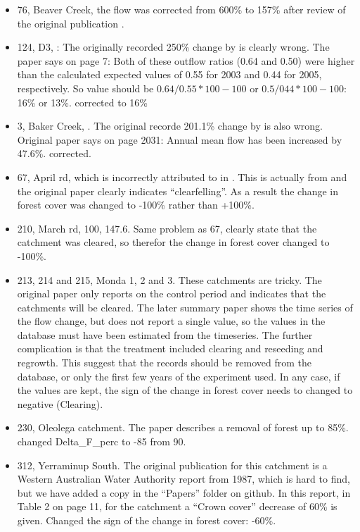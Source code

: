 \documentclass[]{elsarticle} %
\providecommand{\tightlist}{%
  \setlength{\itemsep}{0pt}\setlength{\parskip}{0pt}}
\begin{document}
\begin{itemize}
\tightlist
\item
  76, Beaver Creek, the flow was corrected from 600\% to 157\% after review of the original publication \citep{baker1984}.
\item
  124, D3, \citet{amatya2008effects}: The originally recorded 250\% change by \citet{zhang2017} is clearly wrong. The paper says on page 7: Both of these outflow ratios (0.64 and 0.50) were higher than the calculated expected values of 0.55 for 2003 and 0.44 for 2005, respectively. So value should be \(0.64/0.55*100 - 100\) or \(0.5/044*100 - 100\): 16\% or 13\%. corrected to 16\%
\item
  3, Baker Creek, \citet{zhangwei2012}. The original recorde 201.1\% change by \citet{zhang2017} is also wrong. Original paper says on page 2031: Annual mean flow has been increased by 47.6\%. corrected.
\item
  67, April rd, which is incorrectly attributed to \citet{ruprecht1991} in \citet{zhang2017}. This is actually from \citet{ruprecht1989} and the original paper clearly indicates ``clearfelling''. As a result the change in forest cover was changed to -100\% rather than +100\%.
\item
  210, March rd, 100, 147.6. Same problem as 67, \citet{bari1996} clearly state that the catchment was cleared, so therefor the change in forest cover changed to -100\%.
\item
  213, 214 and 215, Monda 1, 2 and 3. These catchments are tricky. The original paper \citep{oshaughnessy1979} only reports on the control period and indicates that the catchments will be cleared. The later summary paper \citep{watson2001} shows the time series of the flow change, but does not report a single value, so the values in the database must have been estimated from the timeseries. The further complication is that the treatment included clearing and reseeding and regrowth. This suggest that the records should be removed from the database, or only the first few years of the experiment used. In any case, if the values are kept, the sign of the change in forest cover needs to changed to negative (Clearing).
\item
  230, Oleolega catchment. The paper describes a removal of forest up to 85\%. changed Delta\_F\_perc to -85 from 90.
\item
  312, Yerraminup South. The original publication for this catchment is a Western Australian Water Authority report from 1987, which is hard to find, but we have added a copy in the ``Papers'' folder on github. In this report, in Table 2 on page 11, for the catchment a ``Crown cover'' decrease of 60\% is given. Changed the sign of the change in forest cover: -60\%.

\end{itemize}
\end{document}
